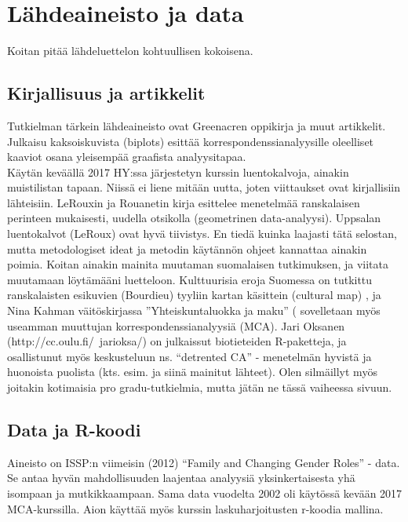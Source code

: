 \section{Lähdeaineisto ja data}
\label{displahteet1}

Koitan pitää lähdeluettelon kohtuullisen kokoisena.

\subsection{Kirjallisuus ja artikkelit}

Tutkielman tärkein lähdeaineisto ovat Greenacren oppikirja \cite{RefWorks:56} ja muut artikkelit. Julkaisu kaksoiskuvista (biplots) \cite{RefWorks:55} esittää korrespondenssianalyysille oleelliset kaaviot osana yleisempää graafista analyysitapaa. \\

Käytän keväällä 2017 HY:ssa järjestetyn kurssin luentokalvoja, ainakin muistilistan tapaan. Niissä ei liene mitään uutta, joten viittaukset ovat kirjallisiin
lähteisiin. LeRouxin ja Rouanetin \cite{RefWorks:68} kirja esittelee menetelmää ranskalaisen perinteen mukaisesti, uudella otsikolla (geometrinen data-analyysi). Uppsalan luentokalvot (LeRoux) ovat hyvä tiivistys. En tiedä kuinka laajasti tätä selostan, mutta metodologiset ideat ja metodin käytännön ohjeet kannattaa ainakin poimia.
Koitan ainakin mainita muutaman suomalaisen tutkimuksen, ja viitata muutamaan löytämääni luetteloon. Kulttuurisia eroja Suomessa on tutkittu ranskalaisten esikuvien (Bourdieu) tyyliin kartan käsittein (cultural map) \cite{RefWorks:72}, ja Nina Kahman väitöskirjassa ''Yhteiskuntaluokka ja maku'' (\cite{RefWorks:74} sovelletaan myös useamman muuttujan korrespondenssianalyysiä (MCA). Jari Oksanen (http://cc.oulu.fi/~jarioksa/) on julkaissut biotieteiden R-paketteja, ja osallistunut myös keskusteluun ns. ``detrented CA'' - menetelmän hyvistä ja huonoista puolista (kts. esim.  \cite{RefWorks:70} ja siinä mainitut lähteet). Olen silmäillyt myös joitakin kotimaisia pro gradu-tutkielmia, mutta jätän ne tässä vaiheessa sivuun.




\subsection{Data ja R-koodi}

Aineisto on ISSP:n viimeisin (2012) ``Family and Changing Gender Roles'' - data. Se antaa hyvän mahdollisuuden laajentaa analyysiä yksinkertaisesta yhä isompaan ja mutkikkaampaan. Sama data vuodelta 2002 oli käytössä kevään 2017 MCA-kurssilla. Aion käyttää myös kurssin laskuharjoitusten r-koodia mallina.\\

